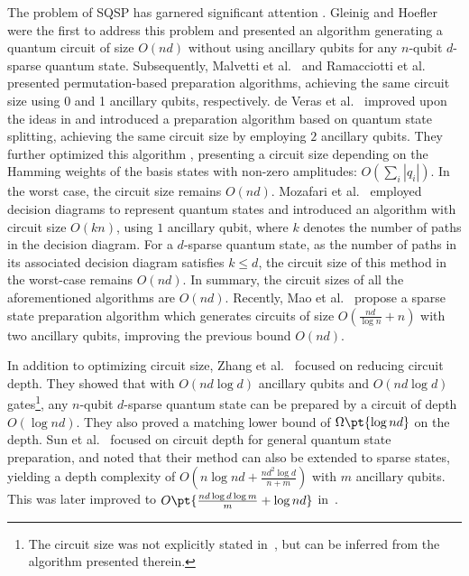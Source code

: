 \documentclass[a4paper,UKenglish,cleveref, autoref, thm-restate]{lipics-v2021}
\newcommand{\bo}{O\pt}
\newcommand{\om}{\Omega\pt}
\begin{document}
The problem of SQSP  has garnered significant attention \cite{gleinig2021efficient, malvetti2021quantum, ramacciotti2023simple, mozafari2022efficient, de2020circuit, de2022double, zhang2022quantum, sun2023asymptotically, mao2024towards}. 
  Gleinig and Hoefler \cite{gleinig2021efficient} were the first to address this problem and presented an algorithm generating a quantum circuit of size $O(nd)$ without using ancillary qubits for any $n$-qubit $d$-sparse quantum state. 
Subsequently, Malvetti et al.~\cite{malvetti2021quantum} and Ramacciotti et al.~\cite{ramacciotti2023simple} presented permutation-based preparation algorithms, achieving the same circuit size using 0 and 1 ancillary qubits, respectively.
 de Veras et al.~\cite{de2020circuit} improved upon the ideas in \cite{park2019circuit, trugenberger2001probabilistic} and introduced a preparation algorithm based on quantum state splitting, achieving the same circuit size by employing $2$ ancillary qubits.  They further optimized this algorithm \cite{de2022double}, presenting a circuit size depending on the Hamming weights of the basis states with non-zero amplitudes: $O(\sum_i |{q}_i|)$. In the worst case, the circuit size remains $O(nd)$. Mozafari et al.~\cite{mozafari2022efficient} employed decision diagrams to represent quantum states and introduced an algorithm with circuit size $O(kn)$, using $1$ ancillary qubit, where $k$ denotes the number of paths in the decision diagram. For a $d$-sparse quantum state, as the number of paths in its associated decision diagram satisfies $k \leq d$, the circuit size of this method in the worst-case remains $O(nd)$. In summary, the circuit sizes of all the aforementioned algorithms are $O(nd)$.  Recently, Mao et al.~\cite{mao2024towards} propose a sparse state preparation algorithm which generates  circuits of size $O(\frac{nd}{\log n} + n)$ with two ancillary qubits, improving the previous bound  $O(nd)$. 

In addition to optimizing circuit size, Zhang et al.~\cite{zhang2022quantum} focused on reducing circuit depth. They showed that with $O(nd\log d)$ ancillary qubits and $O(nd\log d)$ gates\footnote{The circuit size was not explicitly stated in~\cite{zhang2022quantum}, but can be inferred from the algorithm presented therein.}, any $n$-qubit $d$-sparse quantum state can be prepared by a circuit of depth $O(\log nd)$. They also proved a matching lower bound of $\om{\log nd}$ on the depth.  
Sun et al.~\cite{sun2023asymptotically} focused on circuit depth for general quantum state preparation, and noted that their method can also be extended to sparse states, yielding a depth complexity of $O(n\log nd + \frac{nd^2\log d}{n + m})$ with $m$ ancillary qubits. This was later improved to $\bo{\frac{nd\log d\log m}{m} + \log nd}$ in~\cite{zhang2024circuit}.
\end{document}
